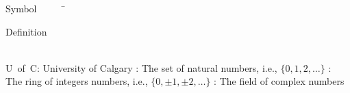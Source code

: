 


\begin{tabbing}
Symbol~~~~~\= \ \ \ \ \ \ \ \ \ \ \ \ \ \ \ \ \ \ \ \ \ \ \ \ \ \ \ \ \ \ \ \ \ \ \ \  \parbox{5in}{Definition}\\

\addsymbol \mbox{U of C}: {University of Calgary}
\addsymbol \mbox{\nat}: {The set of natural numbers, i.e., $\{0,1,2,\ldots\}$}
\addsymbol \mbox{\integers}: {The ring of integers numbers, i.e., $\{0,\pm1,\pm2,\ldots\}$}
\addsymbol \mbox{\complex}: {The field of complex numbers}

\end{tabbing}
